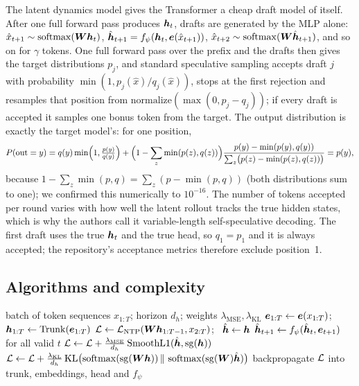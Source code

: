 The latent dynamics model gives the Transformer a cheap draft model of itself. After one full
forward pass produces $\bm{h}_t$, drafts are generated by the MLP alone:
$\hat x_{t+1}\sim\operatorname{softmax}(\bm{W}\bm{h}_t)$, $\hat{\bm{h}}_{t+1}=f_\psi(\bm{h}_t,\bm{e}(\hat x_{t+1}))$,
$\hat x_{t+2}\sim\operatorname{softmax}(\bm{W}\hat{\bm{h}}_{t+1})$, and so on for $\gamma$ tokens. One full forward pass
over the prefix and the drafts then gives the target distributions $p_j$, and standard speculative
sampling \citep{c08-leviathan2023speculative} accepts draft $j$ with probability
$\min(1,p_j(\hat x)/q_j(\hat x))$, stops at the first rejection and resamples that position from
$\mathrm{normalize}(\max(0,p_j-q_j))$; if every draft is accepted it samples one bonus token from the
target. The output distribution is exactly the target model's: for one position,
\[
  P(\text{out}=y)=q(y)\min\Bigl(1,\tfrac{p(y)}{q(y)}\Bigr)
  +\Bigl(1-\sum_z\min(p(z),q(z))\Bigr)\frac{p(y)-\min(p(y),q(y))}{\sum_z\bigl(p(z)-\min(p(z),q(z))\bigr)}
  =p(y),
\]
because $1-\sum_z\min(p,q)=\sum_z(p-\min(p,q))$ (both distributions sum to one); we confirmed this
numerically to $10^{-16}$. The number of tokens accepted per round varies with how well the latent
rollout tracks the true hidden states, which is why the authors call it variable-length
self-speculative decoding. The first draft uses the true $\bm{h}_t$ and the true head, so $q_1=p_1$ and
it is always accepted; the repository's acceptance metrics therefore exclude position~1.

\subsection{Algorithms and complexity}

\begin{algorithm}[t]
\caption{NextLat training step}\label{alg:c08-nextlat-train}
\begin{algorithmic}[1]
\Require batch of token sequences $x_{1:T}$; horizon $d_h$; weights $\lambda_{\mathrm{MSE}},\lambda_{\mathrm{KL}}$
\State $\bm{e}_{1:T}\gets\bm{e}(x_{1:T})$; \ $\bm{h}_{1:T}\gets\mathrm{Trunk}(\bm{e}_{1:T})$ 
\State $\mathcal{L}\gets\mathcal{L}_{\mathrm{NTP}}(\bm{W}\bm{h}_{1:T-1},x_{2:T})$; \ $\hat{\bm{h}}\gets\bm{h}$
  \State $\hat{\bm{h}}_{t+1}\gets f_\psi(\hat{\bm{h}}_t,\bm{e}_{t+1})$ for all valid $t$ 
  \State $\mathcal{L}\gets\mathcal{L}+\frac{\lambda_{\mathrm{MSE}}}{d_h}\,\mathrm{SmoothL1}(\hat{\bm{h}},\mathrm{sg}(\bm{h}))$
  \State $\mathcal{L}\gets\mathcal{L}+\frac{\lambda_{\mathrm{KL}}}{d_h}\,\mathrm{KL}\bigl(\operatorname{softmax}(\mathrm{sg}(\bm{W}\bm{h}))\,\|\,\operatorname{softmax}(\mathrm{sg}(\bm{W})\hat{\bm{h}})\bigr)$
\EndFor
\State backpropagate $\mathcal{L}$ into trunk, embeddings, head and $f_\psi$
\end{algorithmic}
\end{algorithm}

